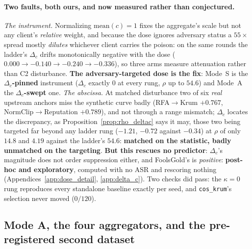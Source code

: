 \documentclass{article}
\begin{document}
\paragraph{Two faults, both ours, and now measured rather than conjectured.} \emph{The instrument.} Normalizing $\mathrm{mean}(c){=}1$ fixes the aggregate's scale but not any client's \emph{relative} weight, and because the dose ignores adversary status a $55\times$ spread mostly \emph{dilutes} whichever client carries the poison: on the same rounds the ladder's $\Delta_c$ drifts monotonically negative with the dose ($0.000 \to -0.140 \to -0.240 \to -0.336$), so three arms measure attenuation rather than C2 disturbance. \textbf{The adversary-targeted dose is the fix}: Mode~S is the \textbf{$\Delta_c$-pinned} instrument ($\Delta_c$ exactly $0$ at every rung, $\rho$ up to $54.6$) and Mode~A the \textbf{$\Delta_c$-swept} one. \emph{The abscissa.} At matched disturbance two of six \emph{real} upstream anchors miss the synthetic curve badly (RFA$\to$Krum $+0.767$, NormClip$\to$Reputation $+0.789$), and not through a range mismatch; $\Delta_c$ locates the discrepancy, as Proposition~\ref{prop:rho_deltac} says it may, those two being targeted far beyond any ladder rung ($-1.21$, $-0.72$ against $-0.34$) at $\rho$ of only $14.8$ and $4.19$ against the ladder's $54.6$: \textbf{matched on the statistic, badly unmatched on the targeting}. \textbf{But this rescues no predictor}: $\Delta_c$'s magnitude does not order suppression either, and FoolsGold's is \emph{positive}: \textbf{post-hoc and exploratory}, computed with no ASR and rescoring nothing (Appendices~\ref{app:dose_detail}, \ref{app:delta_c}). Two checks did pass: the $\kappa{=}0$ rung reproduces every standalone baseline exactly per seed, and \texttt{cos\_krum}'s selection never moved ($0/120$).

\subsection{Mode A, the four aggregators, and the pre-registered second dataset}
\end{document}
